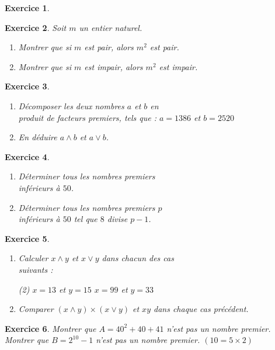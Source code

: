 \documentclass[12pt,a4paper]{article}
\theoremstyle{mystyle}
\newtheorem{exo}{Exercice}
\begin{document}
\begin{multicols*}{2}
\begin{exo}
\end{exo}

\begin{exo}

    Soit $m$ un entier naturel.
    \begin{enumerate}
        \item Montrer que si $m$ est pair, alors $m^2$ est pair.
        \item Montrer que si $m$ est impair, alors $m^2$ est impair.
    \end{enumerate}
\end{exo}

\begin{exo}
    \leavevmode
    \begin{enumerate}
        \item Décomposer les deux nombres $a$ et $b$ en\\ produit de facteurs premiers, tels que : $a = 1386$ et $b = 2520$
        \item En déduire $a\wedge b$ et $a\vee b$.
    \end{enumerate}
\end{exo}

\begin{exo}
    \leavevmode
    \begin{enumerate}
        \item Déterminer tous les nombres premiers\\inférieurs à $50$.
        \item Déterminer tous les nombres premiers $p$\\inférieurs à $50$ tel que $8$ divise $p-1$.
    \end{enumerate}
\end{exo}

\begin{exo}
   \leavevmode
    \begin{enumerate}
        \item Calculer $x\wedge y$ et $x\vee y$ dans chacun des cas\\ suivants :
        \vspace{-2.5mm}\begin{tasks}(2)
            \task[$\bullet$] $x=13$ et $y=15$ 
            \task[$\bullet$] $x=99$ et $y=33$ 
        \end{tasks}\vspace{-2.5mm}
        \item Comparer $(x\wedge y)\times(x\vee y)$ et $xy$ dans chaque cas précédent.
    \end{enumerate}
\end{exo}

\begin{exo}
    Montrer que $A = 40^2+40+41$ n'est pas un nombre premier.\\
    Montrer que $B = 2^{10} - 1$ n'est pas un nombre premier. $(10 = 5 \times 2)$
\end{exo}


\end{multicols*}
\end{document}
